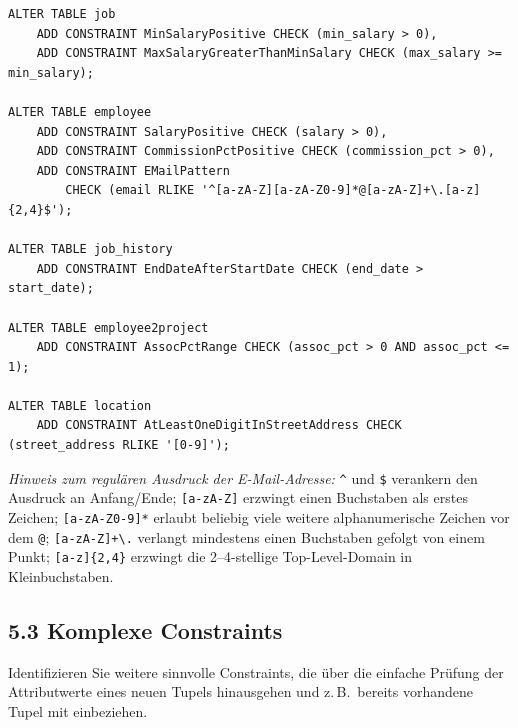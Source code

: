 \documentclass[11pt,a4paper]{article}
\begin{document}
\begin{loesung}[ (5.1 \& 5.2)]
\begin{lstlisting}
ALTER TABLE job
    ADD CONSTRAINT MinSalaryPositive CHECK (min_salary > 0),
    ADD CONSTRAINT MaxSalaryGreaterThanMinSalary CHECK (max_salary >= min_salary);

ALTER TABLE employee
    ADD CONSTRAINT SalaryPositive CHECK (salary > 0),
    ADD CONSTRAINT CommissionPctPositive CHECK (commission_pct > 0),
    ADD CONSTRAINT EMailPattern
        CHECK (email RLIKE '^[a-zA-Z][a-zA-Z0-9]*@[a-zA-Z]+\.[a-z]{2,4}$');

ALTER TABLE job_history
    ADD CONSTRAINT EndDateAfterStartDate CHECK (end_date > start_date);

ALTER TABLE employee2project
    ADD CONSTRAINT AssocPctRange CHECK (assoc_pct > 0 AND assoc_pct <= 1);

ALTER TABLE location
    ADD CONSTRAINT AtLeastOneDigitInStreetAddress CHECK (street_address RLIKE '[0-9]');
\end{lstlisting}
\emph{Hinweis zum regul\"aren Ausdruck der E-Mail-Adresse:} \texttt{\^{}} und \texttt{\$} verankern den Ausdruck an Anfang/Ende; \texttt{[a-zA-Z]} erzwingt einen Buchstaben als erstes Zeichen; \texttt{[a-zA-Z0-9]*} erlaubt beliebig viele weitere alphanumerische Zeichen vor dem \texttt{@}; \texttt{[a-zA-Z]+\textbackslash.} verlangt mindestens einen Buchstaben gefolgt von einem Punkt; \texttt{[a-z]\{2,4\}} erzwingt die 2--4-stellige Top-Level-Domain in Kleinbuchstaben.
\end{loesung}

\subsection*{5.3 \quad Komplexe Constraints}
Identifizieren Sie weitere sinnvolle Constraints, die \"uber die einfache Pr\"ufung der Attributwerte eines neuen Tupels hinausgehen und z.\,B.\ bereits vorhandene Tupel mit einbeziehen.
\end{document}
